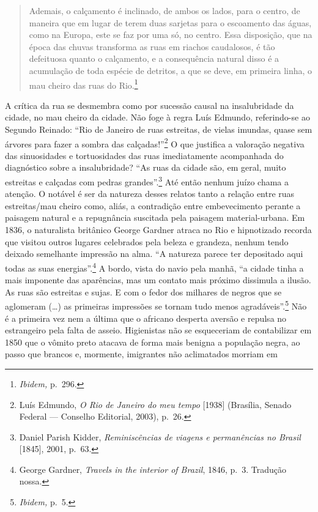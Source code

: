 \begin{quote}
Ademais, o calçamento é inclinado, de ambos os lados, para o centro, de
maneira que em lugar de terem duas sarjetas para o escoamento das águas,
como na Europa, este se faz por uma só, no centro. Essa disposição, que
na época das chuvas transforma as ruas em riachos caudalosos, é tão
defeituosa quanto o calçamento, e a consequência natural disso é a
acumulação de toda espécie de detritos, a que se deve, em primeira
linha, o mau cheiro das ruas do Rio.\footnote{\textit{Ibidem,} p.~296.}
\end{quote}

A crítica da rua se desmembra como por sucessão causal na insalubridade
da cidade, no mau cheiro da cidade. Não foge à regra Luís Edmundo,
referindo-se ao Segundo Reinado: ``Rio de Janeiro de ruas estreitas, de
vielas imundas, quase sem árvores para fazer a sombra das
calçadas!''\footnote{Luís Edmundo, \textit{O Rio de Janeiro do meu tempo}
  {[}1938{]} (Brasília, Senado Federal --- Conselho Editorial, 2003),
  p.~26.} O que justifica a valoração negativa das sinuosidades e
tortuosidades das ruas imediatamente acompanhada do diagnóstico sobre a
insalubridade? ``As ruas da cidade são, em geral, muito estreitas e
calçadas com pedras grandes''.\footnote{Daniel Parish Kidder,
  \textit{Reminiscências de viagens e permanências no Brasil} {[}1845{]},
  2001, p.~63.} Até então nenhum juízo chama a atenção. O notável é ser
da natureza desses relatos tanto a relação entre ruas estreitas/mau
cheiro como, aliás, a contradição entre embevecimento perante a paisagem
natural e a repugnância suscitada pela paisagem material-urbana. Em
1836, o naturalista britânico George Gardner atraca no Rio e hipnotizado
recorda que visitou outros lugares celebrados pela beleza e grandeza,
nenhum tendo deixado semelhante impressão na alma. ``A natureza parece
ter depositado aqui todas as suas energias''.\footnote{George Gardner,
  \textit{Travels in the interior of Brazil}, 1846, p.~3. Tradução nossa.}
A bordo, vista do navio pela manhã, ``a cidade tinha a mais imponente
das aparências, mas um contato mais próximo dissimula a ilusão. As ruas
são estreitas e sujas. E com o fedor dos milhares de negros que se
aglomeram (\ldots{}) as primeiras impressões se tornam tudo menos
agradáveis''.\footnote{\textit{Ibidem,} p.~5.} Não é a primeira vez nem a
última que o africano desperta aversão e repulsa no estrangeiro pela
falta de asseio. Higienistas não se esqueceriam de contabilizar em 1850
que o vômito preto atacava de forma mais benigna a população negra, ao
passo que brancos e, mormente, imigrantes não aclimatados morriam em
